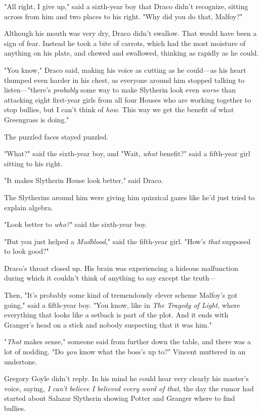 "All right, I give up," said a sixth-year boy that Draco didn't recognize,
sitting across from him and two places to his right. "Why did you do that,
Malfoy?"

Although his mouth was very dry, Draco didn't swallow. That would have been a
sign of fear. Instead he took a bite of carrots, which had the most moisture of
anything on his plate, and chewed and swallowed, thinking as rapidly as he
could.

"You know," Draco said, making his voice as cutting as he could---as his heart
thumped even harder in his chest, as everyone around him stopped talking to
listen---"there's \emph{probably} some way to make Slytherin look even
\emph{worse} than attacking eight first-year girls from all four Houses who are
working together to stop bullies, but I can't think of \emph{how}. This way we
get the benefit of what Greengrass is doing."

The puzzled faces stayed puzzled.

"What?" said the sixth-year boy, and "Wait, \emph{what} benefit?" said a
fifth-year girl sitting to his right.

"It makes Slytherin House look better," said Draco.

The Slytherins around him were giving him quizzical gazes like he'd just tried
to explain algebra.

"Look better to \emph{who?}" said the sixth-year boy.

"But you just helped a \emph{Mudblood}," said the fifth-year girl. "How's
\emph{that} supposed to look good?"

Draco's throat closed up. His brain was experiencing a hideous malfunction
during which it couldn't think of anything to say except the truth---

Then, "It's probably some kind of tremendously clever scheme Malfoy's got
going," said a fifth-year boy. "You know, like in \emph{The Tragedy of Light},
where everything that looks like a setback is part of the plot. And it ends
with Granger's head on a stick and nobody suspecting that it was him."

"\emph{That} makes sense," someone said from further down the table, and there
was a lot of nodding.
\sbreak
"Do \emph{you} know what the boss's up to?" Vincent muttered in an undertone.

Gregory Goyle didn't reply. In his mind he could hear very clearly his master's
voice, saying, \emph{I can't believe I believed every word of that}, the day
the rumor had started about Salazar Slytherin showing Potter and Granger where
to find bullies.

